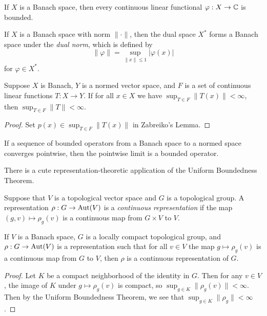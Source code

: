 \begin{cor} If $X$ is a Banach space, then every continuous linear functional $\varphi : X \rightarrow \mathbb{C}$ is bounded.
\end{cor}

\begin{defn} If $X$ is a Banach space with norm $\|\cdot\|$, then the dual space $X^*$ forms a Banach space under the \emph{dual norm}, which is defined by
\[
\|\varphi\| = \sup_{\|x\| \le 1} |\varphi(x)|
\]
for $\varphi \in X^*$.
\end{defn}

\begin{thm} Suppose $X$ is Banach, $Y$ is a normed vector space, and $F$ is a set of continuous linear functions $T:X\rightarrow Y$. If for all $x \in X$ we have $\sup_{T\in F} \|T(x)\| < \infty$, then $\sup_{T \in F} \|T\| < \infty$.
\end{thm}
\begin{proof} Set $p(x) \in \sup_{T\in F} \|T(x)\|$ in Zabreiko's Lemma.
\end{proof}

\begin{cor} If a sequence of bounded operators from a Banach space to a normed space converges pointwise, then the pointwise limit is a bounded operator.
\end{cor}

There is a cute representation-theoretic application of the Uniform Boundedness Theorem.

\begin{defn} Suppose that $V$ is a topological vector space and $G$ is a topological group. A representation $\rho : G \rightarrow \operatorname{Aut}(V)$ is a \emph{continuous representation} if the map $(g,v) \mapsto \rho_g(v)$ is a continuous map from $G\times V$ to $V$.
\end{defn}

\begin{thm} If $V$ is a Banach space, $G$ is a locally compact topological group, and $\rho : G \rightarrow \operatorname{Aut}(V)$ is a representation such that for all $v \in V$ the map $g \mapsto \rho_g(v)$ is a continuous map from $G$ to $V$, then $\rho$ is a continuous representation of $G$.
\end{thm}
\begin{proof} Let $K$ be a compact neighborhood of the identity in $G$. Then for any $v \in V$, the image of $K$ under $g \mapsto \rho_g(v)$ is compact, so $\sup_{g \in K} \|\rho_g(v)\| < \infty$. Then by the Uniform Boundedness Theorem, we see that $\sup_{g \in K} \|\rho_g\| < \infty$.
\end{proof}


